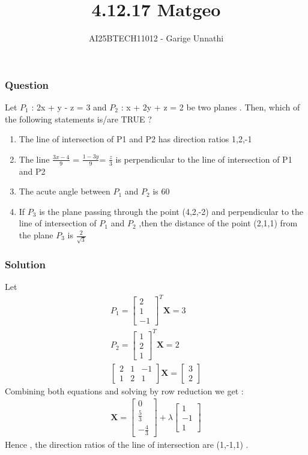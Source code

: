\documentclass{beamer}
\title{4.12.17 Matgeo}
\author{AI25BTECH11012 - Garige Unnathi}
\date{}
\begin{document}
\frame{\titlepage}

\begin{frame}
\frametitle{Question}
Let $P_1$ : 2x + y - z = 3 and $P_2$ : x + 2y + z = 2 be two planes . Then, which of the following statements is/are TRUE ?
\begin{enumerate}
    \item The line of intersection of P1 and P2 has direction ratios 1,2,-1
    \item The line $\frac{3x-4}{9}$ = $\frac{1-3y}{9} $= $\frac{z}{3}$ is perpendicular to the line of intersection of P1 and P2
    \item The acute angle between $P_1$ and $P_2$ is 60\degree
    \item If $P_3$ is the plane passing through the point (4,2,-2) and perpendicular to the line of intersection of $P_1$ and $P_2$ ,then the distance of the point (2,1,1) from the plane $P_3$ is $\frac{2}{\sqrt{3}}$
\end{enumerate}
\end{frame}


\begin{frame}
\frametitle{Solution}
Let 
\begin{align}
    P_1 = \begin{bmatrix}2\\1\\-1\end{bmatrix}^{T}\textbf{X} = 3 \\
    P_2 = \begin{bmatrix}1\\2\\1\end{bmatrix}^{T}\textbf{X} = 2\\
    \begin{bmatrix}2 &1 &-1\\1&2&1\end{bmatrix}\textbf{X} = \begin{bmatrix}3\\2\end{bmatrix}
\end{align}
Combining both equations and solving by row reduction we get :
\begin{align}
  \textbf{X} = \begin{bmatrix}0\\ \frac{5}{3} \\ -\frac{4}{3}\end{bmatrix} + \lambda\begin{bmatrix}1\\-1\\1\end{bmatrix}
\end{align}
Hence , the direction ratios of the line of intersection are (1,-1,1) . 
\end{frame}
\end{document}
